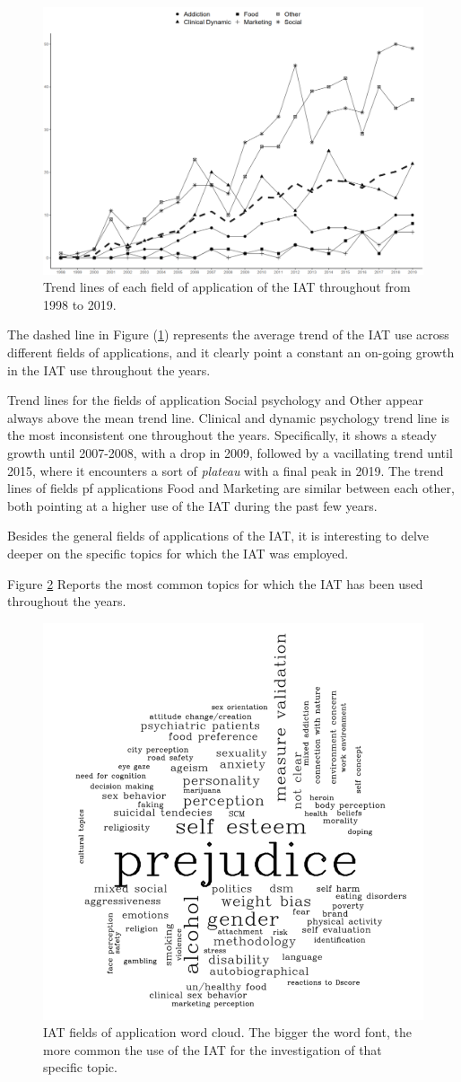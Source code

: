 \documentclass[12pt]{book}
\begin{document}
\begin{figure}
	\centering
	\includegraphics[width=0.8\linewidth]{yeartopic.png}
	\caption{\label{fig:topicyear} Trend lines of each field of application of the IAT throughout from 1998 to 2019. }
\end{figure}

The dashed line in Figure (\ref{fig:topicyear}) represents the average trend of the IAT use across different fields of applications, and it clearly point a constant an on-going growth in the IAT use throughout the years. 

Trend lines for the fields of application Social psychology and Other appear always above the mean trend line. Clinical and dynamic psychology trend line is the most inconsistent one throughout the years. Specifically, it shows a steady growth until 2007-2008, with a drop in 2009, followed by a vacillating trend until 2015, where it encounters a sort of \emph{plateau} with a final peak in 2019. The trend lines of fields pf applications Food and Marketing are similar between each other, both pointing at a higher use of the IAT during the past few years. 

Besides the general fields of applications of the IAT, it is interesting to delve deeper on the specific topics for which the IAT was employed.  

Figure \ref{fig:wordcloud} Reports the most common topics for which the IAT has been used throughout the years. 

\begin{figure}
	\centering
	\includegraphics[width=0.5\linewidth]{wordcloudtopic.png}
	\caption{\label{fig:wordcloud} IAT fields of application word cloud.  The bigger the word font, the more common the use of the IAT for the investigation of that specific topic.}
\end{figure}
\end{document}
